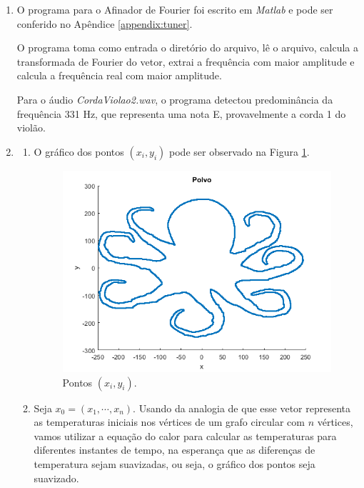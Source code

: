\documentclass{article}
\begin{document}
        \begin{enumerate}
            \item O programa para o Afinador de Fourier
                foi escrito em \textit{Matlab} e pode ser conferido
                no Apêndice \ref{appendix:tuner}.

                O programa toma como entrada o diretório do arquivo,
                lê o arquivo, calcula a transformada de Fourier do vetor, extrai
                a frequência com maior amplitude e calcula a frequência real
                com maior amplitude.

                Para o áudio \textit{CordaViolao2.wav}, o programa detectou
                predominância da frequência 331 Hz, que representa uma nota E,
                provavelmente a corda 1 do violão.

            \item \begin{enumerate}
                    \item O gráfico dos pontos $(x_i, y_i)$ pode ser observado na Figura \ref{fig:octopus}.
                    
                        \begin{figure}[!h]
                            \centering
                            \includegraphics[width=\textwidth]{octopus.png}
                            \caption{Pontos $(x_i, y_i)$.}
                            \label{fig:octopus}
                        \end{figure}

                    \item Seja $x_0 = (x_1, \cdots, x_n)$.
                        Usando da analogia de que esse vetor representa as temperaturas iniciais
                        nos vértices de um grafo circular com $n$ vértices,
                        vamos utilizar a equação do calor para calcular as temperaturas
                        para diferentes instantes de tempo, na esperança que as diferenças
                        de temperatura sejam suavizadas, ou seja, o gráfico dos pontos seja suavizado.


\end{enumerate}
\end{enumerate}
\end{document}
